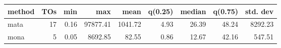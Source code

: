 \begin{tabular}{lrrrrrrrr}
\hline
 method   &   TOs &   min &      max &    mean &   q(0.25) &   median &   q(0.75) &   std. dev \\
\hline
 mata     & 17 &  0.16 & 97877.41 & 1041.72 &      4.93 &    26.39 &     48.24 &    8292.23 \\
 mona     &  5 &  0.05 &  8692.85 &   82.55 &      0.86 &    12.67 &     42.16 &     547.51 \\
\hline
\end{tabular}
